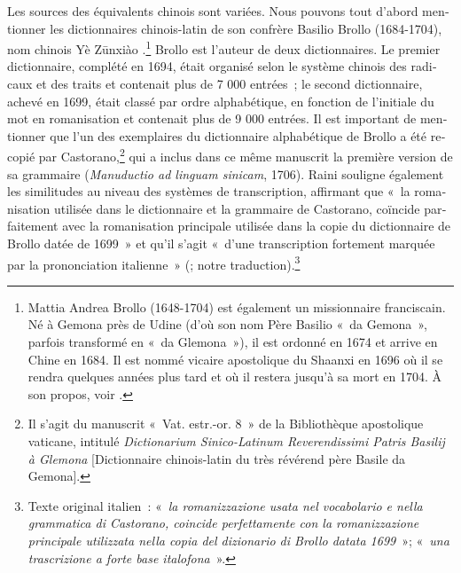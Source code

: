 \documentclass[output=paper,colorlinks,citecolor=brown,arabicfont,chinesefont,booklanguage=french]{langscibook}
\begin{document}
\begin{otherlanguage}{french}
Les sources des équivalents chinois sont variées. Nous pouvons tout d’abord mentionner les dictionnaires chinois-latin de son confrère Basilio Brollo (1684-1704), nom chinois Yè Zūnxiào {}.\footnote{Mattia Andrea Brollo (1648-1704) est également un missionnaire franciscain. Né à Gemona près de Udine (d’où son nom Père Basilio «~da Gemona~», parfois transformé en «~da Glemona~»), il est ordonné en 1674 et arrive en Chine en 1684. Il est nommé vicaire apostolique du Shaanxi en 1696 où il se rendra quelques années plus tard et où il restera jusqu’à sa mort en 1704. À son propos, voir \citet{Polmonari2008}. } Brollo est l’auteur de deux dictionnaires. Le premier dictionnaire, complété en 1694, était organisé selon le système chinois des radicaux et des traits et contenait plus de 7 000 entrées~; le second dictionnaire, achevé en 1699, était classé par ordre alphabétique, en fonction de l’initiale du mot en romanisation et contenait plus de 9 000 entrées. Il est important de mentionner que l’un des exemplaires du dictionnaire alphabétique de Brollo a été recopié par Castorano,\footnote{Il s’agit du manuscrit «~Vat. estr.-or. 8~» de la Bibliothèque apostolique vaticane, intitulé \emph{Dictionarium Sinico-Latinum Reverendissimi Patris Basilij à Glemona} [Dictionnaire chinois-latin du très révérend père Basile da Gemona].} qui a inclus dans ce même manuscrit la première version de sa grammaire (\emph{Manuductio ad linguam sinicam}, 1706). Raini souligne également les similitudes au niveau des systèmes de transcription, affirmant que «~la romanisation utilisée dans le dictionnaire et la grammaire de Castorano, coïncide parfaitement avec la romanisation principale utilisée dans la copie du dictionnaire de Brollo datée de 1699~» et qu’il s’agit «~d’une transcription fortement marquée par la prononciation italienne~» (\citealt[236]{Raini2010}; notre traduction).\footnote{Texte original italien~: «~\emph{la romanizzazione usata nel vocabolario e nella grammatica di Castorano, coincide perfettamente con la romanizzazione principale utilizzata nella copia del dizionario di Brollo datata 1699}~»; «~\emph{una trascrizione a forte base italofona}~».}


\end{otherlanguage}
\end{document}
